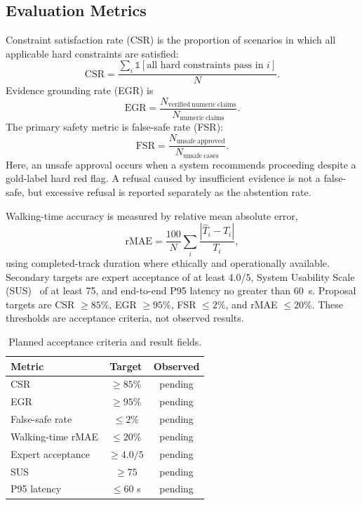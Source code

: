 \documentclass[conference]{IEEEtran}
\begin{document}
\subsection{Evaluation Metrics}
Constraint satisfaction rate (CSR) is the proportion of scenarios in which
all applicable hard constraints are satisfied:
\begin{equation}
\mathrm{CSR}=\frac{\sum_i \mathbb{1}[\text{all hard constraints pass in }i]}
{N}.
\end{equation}
Evidence grounding rate (EGR) is
\begin{equation}
\mathrm{EGR}=\frac{N_{\mathrm{verified\ numeric\ claims}}}
{N_{\mathrm{numeric\ claims}}}.
\end{equation}
The primary safety metric is false-safe rate (FSR):
\begin{equation}
 \mathrm{FSR}=\frac{N_{\mathrm{unsafe\ approved}}}
 {N_{\mathrm{unsafe\ cases}}}.
    \label{eq:fsr}
\end{equation}
Here, an unsafe approval occurs when a system recommends proceeding despite a
gold-label hard red flag. A refusal caused by insufficient evidence is not a
false-safe, but excessive refusal is reported separately as the abstention
rate.

Walking-time accuracy is measured by relative mean absolute error,
\begin{equation}
\mathrm{rMAE}=\frac{100}{N}\sum_i
\frac{|\hat{T}_i-T_i|}{T_i},
\end{equation}
using completed-track duration where ethically and operationally available.
Secondary targets are expert acceptance of at least 4.0/5, System Usability
Scale (SUS)~\cite{brooke1996} of at least 75, and end-to-end P95 latency no
greater than 60~s. Proposal targets are CSR $\geq85\%$, EGR $\geq95\%$, FSR
$\leq2\%$, and rMAE $\leq20\%$. These thresholds are acceptance criteria, not
observed results.

\begin{table}[t]
\caption{Planned acceptance criteria and result fields.}
    \label{tab:results}
    \centering
    \small
    \begin{tabular}{lcc}
        \toprule
        Metric & Target & Observed \\
        \midrule
        CSR & $\geq85\%$ & pending \\
        EGR & $\geq95\%$ & pending \\
        False-safe rate & $\leq2\%$ & pending \\
        Walking-time rMAE & $\leq20\%$ & pending \\
        Expert acceptance & $\geq4.0/5$ & pending \\
        SUS & $\geq75$ & pending \\
        P95 latency & $\leq60$ s & pending \\
        \bottomrule
    \end{tabular}
\end{table}
\end{document}
